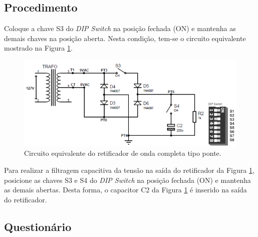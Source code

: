 \documentclass[11pt]{article}
\begin{document}
\subsection*{Procedimento}

Coloque a chave S3 do \textit{DIP Switch} na posição fechada (ON) e mantenha as demais chaves na posição aberta. Nesta condição, tem-se o circuito equivalente mostrado na Figura \ref{circ2}.

\begin{figure}[!htb]
\centering
\includegraphics[width=.7\textwidth]{RetificadorPonte.png}
\caption{Circuito equivalente do retificador de onda completa tipo ponte.}
\label{circ2}
\end{figure}

Para realizar a filtragem capacitiva da tensão na saída do retificador da Figura \ref{circ2}, posicione as chaves S3 e S4 do \textit{DIP Switch} na posição fechada (ON) e mantenha as demais abertas. Desta forma, o capacitor C2 da Figura \ref{circ2} é inserido na saída do retificador.

\subsection*{Questionário}
\end{document}
